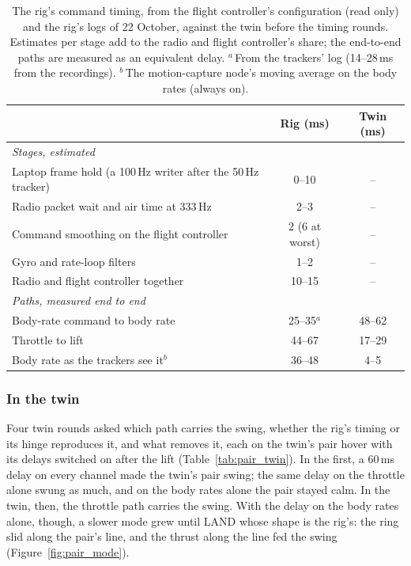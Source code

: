 \begin{table}[htbp]
\centering
\footnotesize
\caption[The rig's command timing]{The rig's command timing, from the flight controller's configuration (read only)
and the rig's logs of 22 October, against the twin before the timing rounds. Estimates per stage add to the radio and
flight controller's share; the end-to-end paths are measured as an equivalent delay. $^a$\,From the trackers' log
(14--28\,ms from the recordings). $^b$\,The motion-capture node's moving average on the body rates (always on).}
\label{tab:pair_timing}
\begin{tabular}{lcc}
\toprule
 & Rig (ms) & Twin (ms) \\
\midrule
\multicolumn{3}{l}{\emph{Stages, estimated}} \\
Laptop frame hold (a 100\,Hz writer after the 50\,Hz tracker) & 0--10 & -- \\
Radio packet wait and air time at 333\,Hz & 2--3 & -- \\
Command smoothing on the flight controller & 2 (6 at worst) & -- \\
Gyro and rate-loop filters & 1--2 & -- \\
Radio and flight controller together & 10--15 & -- \\
\midrule
\multicolumn{3}{l}{\emph{Paths, measured end to end}} \\
Body-rate command to body rate & 25--35$^a$ & 48--62 \\
Throttle to lift & 44--67 & 17--29 \\
Body rate as the trackers see it$^b$ & 36--48 & 4--5 \\
\bottomrule
\end{tabular}
\end{table}

\subsubsection{In the twin}

Four twin rounds asked which path carries the swing, whether the rig's timing or its hinge reproduces it, and what
removes it, each on the twin's pair hover with its delays switched on after the lift (Table~\ref{tab:pair_twin}). In
the first, a 60\,ms delay on every channel made the twin's pair swing; the same delay on the throttle alone swung as
much, and on the body rates alone the pair stayed calm. In the twin, then, the throttle path carries the swing. With
the delay on the body rates alone, though, a slower mode grew until LAND whose shape is the rig's: the ring slid along
the pair's line, and the thrust along the line fed the swing (Figure~\ref{fig:pair_mode}).

